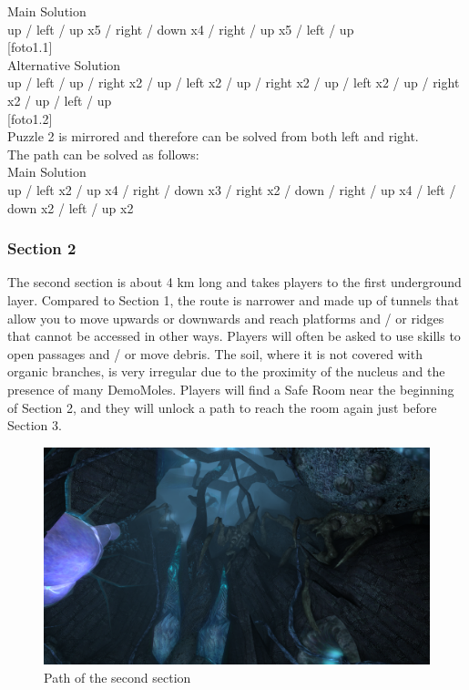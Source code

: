 Main Solution\\
up / left / up x5 / right / down x4 / right / up x5 / left / up\\

[foto1.1]\\

Alternative Solution\\
up / left / up / right x2 / up / left x2 / up / right x2 / up / left x2 / up / right x2 / up / left / up\\

[foto1.2]\\

Puzzle 2 is mirrored and therefore can be solved from both left and right.\\

The path can be solved as follows:\\
Main Solution\\
up / left x2 / up x4 / right / down x3 / right x2 / down / right / up x4 / left / down x2 / left / up x2\\

\newpage


\subsubsection{Section 2}
The second section is about 4 km long and takes players to the first underground layer.
Compared to Section 1, the route is narrower and made up of tunnels that allow you to move upwards or downwards and reach platforms and / or ridges that cannot be accessed in other ways. Players will often be asked to use skills to open passages and / or move debris. The soil, where it is not covered with organic branches, is very irregular due to the proximity of the nucleus and the presence of many DemoMoles. Players will find a Safe Room near the beginning of Section 2, and they will unlock a path to reach the room again just before Section 3.

\vspace*{0.3cm}
\begin{figure}[H]
	\centering
	\includegraphics[width=0.8\linewidth]{images/visual_ref/15_giant_chasm/chasm_section_2.png}
	\caption*{Path of the second section}
\end{figure}

